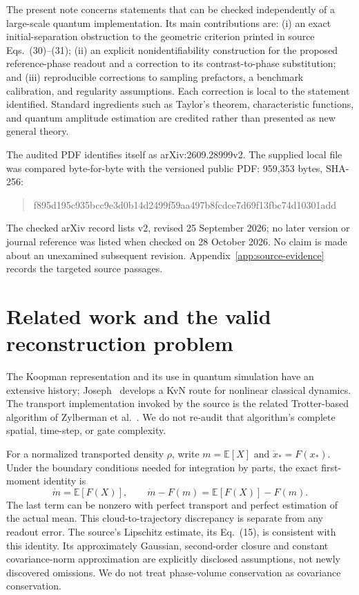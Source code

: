 \documentclass[11pt]{article}
\theoremstyle{definition}
\theoremstyle{remark}
\newcommand{\E}[1]{\mathbb E\!\left[#1\right]}
\begin{document}
The present note concerns statements that can be checked independently of a
large-scale quantum implementation. Its main contributions are: (i) an exact
initial-separation obstruction to the geometric criterion printed in source
Eqs.~(30)--(31); (ii) an explicit nonidentifiability construction for the
proposed reference-phase readout and a correction to its contrast-to-phase
substitution; and (iii) reproducible corrections
to sampling prefactors, a benchmark calibration, and regularity assumptions.
Each correction is local to the statement identified. Standard ingredients
such as Taylor's theorem, characteristic functions, and quantum amplitude
estimation are credited rather than presented as new general theory.

The audited PDF identifies itself as arXiv:2609.28999v2. The supplied local
file was compared byte-for-byte with the versioned public PDF: 959,353 bytes,
SHA-256:
\begin{quote}\small\ttfamily
f895d195c935bcc9e3d0b14d2499f59aa497b8fcdce7d69f13fbc74d10301add
\end{quote}
The checked arXiv record lists v2, revised 25 September 2026; no later
version or journal reference was listed when checked on 28 October 2026.
No claim is made about an unexamined subsequent revision.
Appendix~\ref{app:source-evidence} records the targeted source passages.

\section{Related work and the valid reconstruction problem}
\label{sec:related}
The Koopman representation and its use in quantum simulation have an extensive
history; Joseph~\cite{joseph} develops a KvN route for nonlinear classical
dynamics. The transport implementation invoked by the source is the related
Trotter-based algorithm of Zylberman et al.~\cite{transport}. We do not
re-audit that algorithm's complete spatial, time-step, or gate complexity.

For a normalized transported density $\rho$, write $m=\E{X}$ and
$\dot x_*=F(x_*)$. Under the boundary conditions needed for integration by
parts, the exact first-moment identity is
\begin{equation}
 \dot m=\E{F(X)},\qquad
 \dot m-F(m)=\E{F(X)}-F(m).
 \label{eq:mean-identity}
\end{equation}
The last term can be nonzero with perfect transport and perfect estimation
of the actual mean. This cloud-to-trajectory discrepancy is separate from
any readout error. The source's Lipschitz estimate, its Eq.~(15), is consistent
with this identity. Its approximately Gaussian, second-order closure and
constant covariance-norm approximation are explicitly disclosed assumptions,
not newly discovered omissions. We do not treat phase-volume conservation
as covariance conservation.
\end{document}
